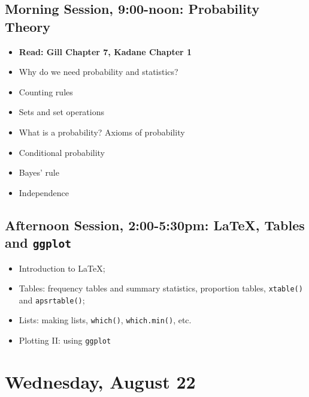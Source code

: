 \documentclass[12pt,a4paper]{article}
\begin{document}
\subsection*{Morning Session, 9:00-noon: Probability Theory}
\begin{itemize}
\setlength{\itemsep}{0pt}
\footnotesize
\item \textbf{Read: Gill Chapter 7, Kadane Chapter 1}
\item Why do we need probability and statistics?
\item Counting rules
\item Sets and set operations
\item What is a probability? Axioms of probability
\item Conditional probability
\item Bayes' rule
\item Independence

\end{itemize}


\subsection*{Afternoon Session, 2:00-5:30pm: \LaTeX, Tables and \texttt{ggplot}}
\begin{itemize}
\setlength{\itemsep}{0pt}
\footnotesize
\item Introduction to \LaTeX;
\item Tables: frequency tables and summary statistics, proportion tables, \texttt{xtable()} and \texttt{apsrtable()};
\item Lists: making lists, \texttt{which()}, \texttt{which.min()}, etc.
\item Plotting II: using \texttt{ggplot}
\end{itemize}

\section*{Wednesday, August 22}
\end{document}

